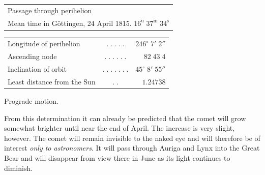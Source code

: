 \begin{center}\fontsize{10}{12}\selectfont\setlength{\tabcolsep}{3pt}\renewcommand{\arraystretch}{1.15}\begin{tabular}{l}
Passage through perihelion\\
\quad Mean time in Göttingen, 24 April 1815. $16^{\mathrm u}\;37^{\mathrm m}\;34^{\mathrm s}$\\
\end{tabular}\end{center}
\begin{center}\fontsize{10}{12}\selectfont\setlength{\tabcolsep}{3pt}\renewcommand{\arraystretch}{1.15}\begin{tabular}{lcr}
Longitude of perihelion & $.\;.\;.\;.\;.$ & $246^\circ\;7'\;2''$\\
Ascending node & $.\;.\;.\;.\;.\;.$ & $82\;43\;4$\\
Inclination of orbit & $.\;.\;.\;.\;.\;.\;.$ & $45^\circ\;8'\;55''$\\
Least distance from the Sun & $.\;.$ & $1.24738$\\
\end{tabular}\end{center}
\noindent Prograde motion.

\par\indent From this determination it can already be predicted that the comet will grow somewhat brighter until near the end of April. The increase is very slight, however. The comet will remain invisible to the naked eye and will therefore be of interest \emph{only to astronomers}. It will pass through Auriga and Lynx into the Great Bear and will disappear from view there in June as its light continues to diminish.

